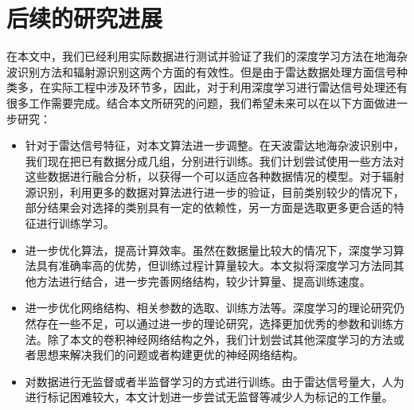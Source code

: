 \section{后续的研究进展}
在本文中，我们已经利用实际数据进行测试并验证了我们的深度学习方法在地海杂波识别方法和辐射源识别这两个方面的有效性。但是由于雷达数据处理方面信号种类多，在实际工程中涉及环节多，因此，对于利用深度学习进行雷达信号处理还有很多工作需要完成。结合本文所研究的问题，我们希望未来可以在以下方面做进一步研究：
\begin{itemize}
	\item 针对于雷达信号特征，对本文算法进一步调整。在天波雷达地海杂波识别中，我们现在把已有数据分成几组，分别进行训练。我们计划尝试使用一些方法对这些数据进行融合分析，以获得一个可以适应各种数据情况的模型。对于辐射源识别，利用更多的数据对算法进行进一步的验证，目前类别较少的情况下，部分结果会对选择的类别具有一定的依赖性，另一方面是选取更多更合适的特征进行训练学习。
	\item 进一步优化算法，提高计算效率。虽然在数据量比较大的情况下，深度学习算法具有准确率高的优势，但训练过程计算量较大。本文拟将深度学习方法同其他方法进行结合，进一步完善网络结构，较少计算量、提高训练速度。 
	\item 进一步优化网络结构、相关参数的选取、训练方法等。深度学习的理论研究仍然存在一些不足，可以通过进一步的理论研究，选择更加优秀的参数和训练方法。除了本文的卷积神经网络结构之外，我们计划尝试其他深度学习的方法或者思想来解决我们的问题或者构建更优的神经网络结构。
	\item 对数据进行无监督或者半监督学习的方式进行训练。由于雷达信号量大，人为进行标记困难较大，本文计划进一步尝试无监督等减少人为标记的工作量。
\end{itemize}
